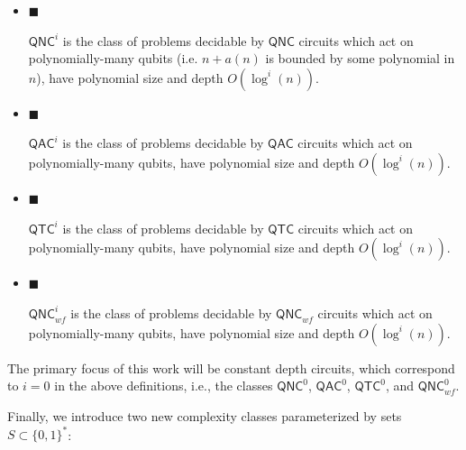 \documentclass[10pt,a4paper]{article}
\begin{document}
\begin{itemize}


\item[] 
$\blacksquare$ 


${\mathsf{QNC}}^{i}$ is the class of problems decidable by ${\mathsf{QNC}}$ circuits which act on polynomially-many qubits (i.e. $n+a(n)$ is bounded by some polynomial in $n$), have polynomial size and depth $O(\log^{i}(n))$.\par





\item[] 
$\blacksquare$ 


${\mathsf{QAC}}^{i}$ is the class of problems decidable by ${\mathsf{QAC}}$ circuits which act on polynomially-many qubits, have polynomial size and depth $O(\log^{i}(n))$.\par





\item[] 
$\blacksquare$ 


${\mathsf{QTC}}^{i}$ is the class of problems decidable by ${\mathsf{QTC}}$ circuits which act on polynomially-many qubits, have polynomial size and depth $O(\log^{i}(n))$.\par





\item[] 
$\blacksquare$ 


${\mathsf{QNC}}^{i}_{wf}$ is the class of problems decidable by ${\mathsf{QNC}}_{wf}$ circuits which act on polynomially-many qubits, have polynomial size and depth $O(\log^{i}(n))$.\par





\end{itemize}




The primary focus of this work will be constant depth circuits, which correspond to $i=0$ in the above definitions, i.e., the classes ${\mathsf{QNC}}^{0}$, ${\mathsf{QAC}}^{0}$, ${\mathsf{QTC}}^{0}$, and ${\mathsf{QNC}}_{wf}^{0}$.\par




Finally, we introduce two new complexity classes parameterized by sets $S\subset\{0,1\}^{*}$:\par
\end{document}
